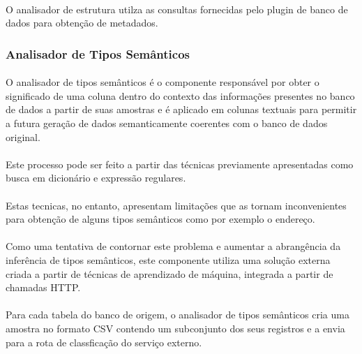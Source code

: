 \paragraph{} O analisador de estrutura utilza as consultas fornecidas pelo plugin de banco de dados para obtenção de metadados.


\subsubsection{Analisador de Tipos Semânticos}

\paragraph{} O analisador de tipos semânticos é o componente responsável por obter o significado de uma coluna dentro do contexto das informações presentes no banco de dados a partir de suas amostras e é aplicado em colunas textuais para permitir a futura geração de dados semanticamente coerentes com o banco de dados original.

\paragraph{} Este processo pode ser feito a partir das técnicas previamente apresentadas como busca em dicionário e expressão regulares.

\paragraph{} Estas tecnicas, no entanto, apresentam limitações que as tornam inconvenientes para obtenção de alguns tipos semânticos como por exemplo o endereço.

\paragraph{} Como uma tentativa de contornar este problema e aumentar a abrangência da inferência de tipos semânticos, este componente utiliza uma solução externa criada a partir de técnicas de aprendizado de máquina, integrada a partir de chamadas HTTP.

\paragraph{} Para cada tabela do banco de origem, o analisador de tipos semânticos cria uma amostra no formato CSV contendo um subconjunto dos seus registros e a envia para a rota de classficação do serviço externo.


